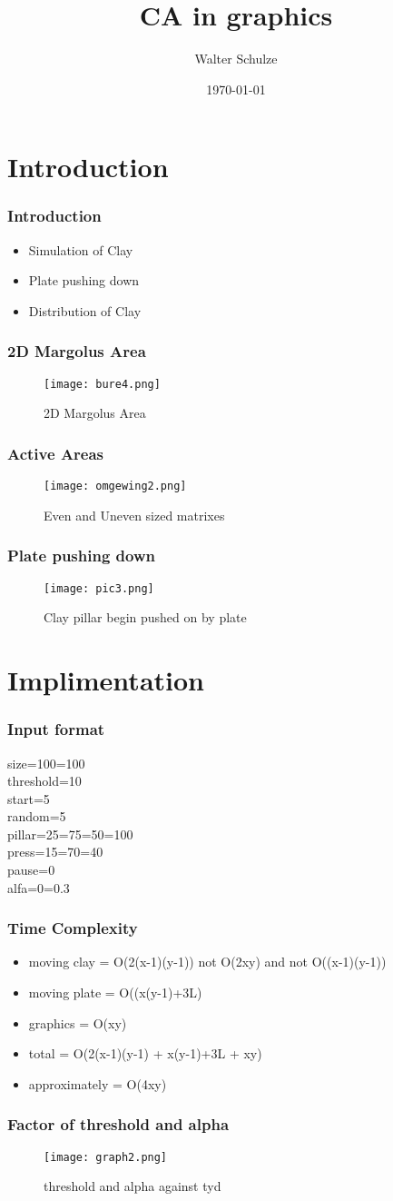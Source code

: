 \documentclass{beamer}
\title{CA in graphics}
\author{Walter Schulze}
\date{\today}
\begin{document}
\frame{\titlepage}

\section[Outline]{}
\frame{\tableofcontents}

\section{Introduction}
\frame
{
  \frametitle{Introduction}
  \begin{itemize}
  \item<1-> Simulation of Clay
  \item<2-> Plate pushing down
  \item<3-> Distribution of Clay
  \end{itemize}
}
\frame
{
	\frametitle{2D Margolus Area}
	\begin{figure}[htbp]
   \centering
   \texttt{[image: bure4.png]}
   \caption{2D Margolus Area}
   \label{Figure:figex}
	\end{figure}
}
\frame
{
	\frametitle{Active Areas}
	\begin{figure}[htbp]
	   \centering
	   \texttt{[image: omgewing2.png]}
	   \caption{Even and Uneven sized matrixes}
	   \label{Figure:figex}
	\end{figure}
}
\frame
{
	\frametitle{Plate pushing down}
	\begin{figure}[htbp]
   \centering
   \texttt{[image: pic3.png]}
   \caption{Clay pillar begin pushed on by plate}
   \label{Figure:figex}
	\end{figure}
}
\section{Implimentation}
\frame
{
	\frametitle{Input format}
	size=100=100 \\
	threshold=10 \\
	start=5 \\
	random=5 \\
	pillar=25=75=50=100 \\
	press=15=70=40 \\
	pause=0 \\
	alfa=0=0.3 \\
}
\frame
{
	\frametitle{Time Complexity}
	\begin{itemize}
	\item<1-> moving clay = O(2(x-1)(y-1)) not O(2xy) and not O((x-1)(y-1))
	\item<2-> moving plate = O((x(y-1)+3L) 
	\item<3-> graphics = O(xy) 
	\item<4-> total = O(2(x-1)(y-1) + x(y-1)+3L + xy)
	\item<5-> approximately = O(4xy) 
	\end{itemize}
}
\frame
{
	\frametitle{Factor of threshold and alpha}
	\begin{figure}[htbp]
   \centering
   \texttt{[image: graph2.png]}
   \caption{threshold and alpha against tyd}
   \label{Figure:figex}
	\end{figure}
}
\end{document}

